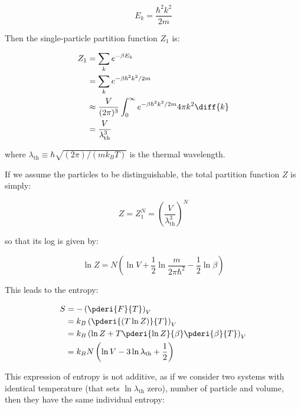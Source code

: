 \documentclass[12pt]{article}
\begin{document}
\begin{equation}
E_{k} = \frac{\hbar^{2} k^{2}}{2m}
\end{equation}

Then the single-particle partition function $Z_{1}$ is:

\begin{equation}
\begin{split}
Z_{1} &= \sum_{k} e^{-\beta E_{k}} \\
      &= \sum_{k} e^{-\beta \hbar^{2} k^{2}/2m} \\
      &\approx \frac{V}{(2\pi)^{3}} \int_{0}^{\infty} e^{-\beta \hbar^{2} k^{2}/2m} 4\pi k^{2} \diff{k} \\
      &= \frac{V}{\lambda_{\text{th}}^3}
\end{split}
\end{equation}

where $\lambda_{\text{th}} \equiv \hbar \sqrt{(2\pi)/(m k_{B} T)}$ is the thermal wavelength.

If we assume the particles to be distinguishable, the total partition function $Z$ is simply:

\begin{equation}
Z = Z_{1}^{N} = \left( \frac{V}{\lambda_{\text{th}}^3} \right)^{N}
\end{equation}

so that its log is given by:

\begin{equation}
\ln{Z} = N \left(\ln{V} + \frac{1}{2} \ln{\frac{m}{2\pi \hbar^{2}}} - \frac{1}{2} \ln{\beta}\right)
\end{equation}

This leads to the entropy:

\begin{equation}
\begin{split}
S &= - \left( \pderi{F}{T} \right)_{V} \\
  &= k_{B} \left( \pderi{(T \ln{Z})}{T} \right)_{V} \\
  &= k_{B} \left( \ln{Z} + T \pderi{\ln{Z}}{\beta} \pderi{\beta}{T} \right)_{V} \\
  &= k_{B} N \left( \ln{V} - 3\ln{\lambda_{\text{th}}} + \frac{1}{2} \right) \\
\end{split}
\end{equation}

This expression of entropy is not additive, as if we consider two systems with identical temperature (that sets $\ln{\lambda_{\text{th}}}$ zero), number of particle and volume, then they have the same individual entropy:
\end{document}
